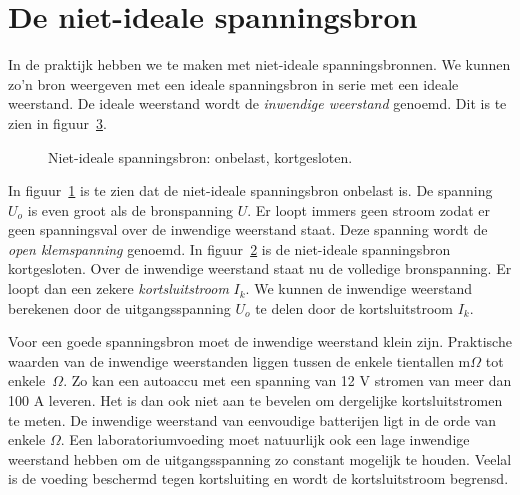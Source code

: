 \section{De niet-ideale spanningsbron}
\label{sec:gelnietidealespanningsbron}
In de praktijk hebben we te maken met niet-ideale spanningsbronnen. We kunnen zo'n bron
weergeven met een ideale spanningsbron in serie met een ideale weerstand. De ideale
weerstand wordt de \textsl{inwendige weerstand} genoemd. Dit is te zien in
figuur~\ref{fig:gelnisopenkort}.

\begin{figure}[!ht]
\begin{subfigure}{0.5\textwidth}
\centering
{}
\caption{}
\label{fig:gelnisopen}
\end{subfigure}%
\begin{subfigure}{0.5\textwidth}
\centering
{}
\caption{}
\label{fig:gelniskort}
\end{subfigure}
\caption{Niet-ideale spanningsbron:  onbelast,  kortgesloten.}
\label{fig:gelnisopenkort}
\end{figure}

In figuur~\ref{fig:gelnisopen} is te zien dat de niet-ideale spanningsbron onbelast is.
De spanning $U_o$ is even groot als de bronspanning $U$. Er loopt immers geen stroom zodat
er geen spanningsval over de inwendige weerstand staat. Deze spanning wordt de \textsl{open
klemspanning} genoemd. In figuur~\ref{fig:gelniskort} is
de niet-ideale spanningsbron kortgesloten. Over de inwendige weerstand staat nu de volledige
bronspanning. Er loopt dan een zekere \textsl{kortsluitstroom} $I_k$. We kunnen de inwendige
weerstand berekenen door de uitgangsspanning $U_o$ te delen door de kortsluitstroom $I_k$.

Voor een goede spanningsbron moet de inwendige weerstand klein zijn. Praktische waarden van
de inwendige weerstanden liggen tussen de enkele tientallen m$\Omega$ tot enkele~$\Omega$.
Zo kan een autoaccu met een spanning van 12 V stromen van meer dan 100 A leveren. Het is dan
ook niet aan te bevelen om dergelijke kortsluitstromen te meten. De inwendige weerstand
van eenvoudige batterijen ligt in de orde van enkele $\Omega$. Een laboratoriumvoeding moet
natuurlijk ook een lage inwendige weerstand hebben om de uitgangsspanning zo constant
mogelijk te houden. Veelal is de voeding beschermd tegen kortsluiting en wordt de
kortsluitstroom begrensd.


